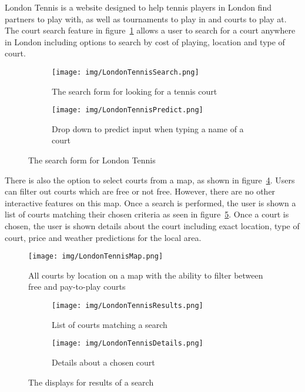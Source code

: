 London Tennis is a website designed to help tennis players in London find partners to play with, as well as tournaments to play in and courts to play at. The court search feature in figure~\ref{fig:LondonTennisSearch} allows a user to search for a court anywhere in London including options to search by cost of playing, location and type of court.

\begin{figure}[ht]
\centering
\begin{subfigure}[b]{0.6\textwidth}
                   \texttt{[image: img/LondonTennisSearch.png]}
                   \caption{The search form for looking for a tennis court}\label{fig:LondonTennisSearch}
\end{subfigure}%
\qquad
\begin{subfigure}[b]{0.3\textwidth}
\texttt{[image: img/LondonTennisPredict.png]}
\caption{Drop down to predict input when typing a name of a court}\label{fig:LondonTennisPredict}
            \end{subfigure}
            \qquad
\caption{The search form for London Tennis}\label{fig:LondonTennisSearchMain}
\end{figure}

There is also the option to select courts from a map, as shown in figure~\ref{fig:LondonTennisMap}. Users can filter out courts which are free or not free. However, there are no other interactive features on this map. Once a search is performed, the user is shown a list of courts matching their chosen criteria as seen in figure~\ref{fig:LondonTennisResults}. Once a court is chosen, the user is shown details about the court including exact location, type of court, price and weather predictions for the local area.

\begin{figure}
\begin{center}
\texttt{[image: img/LondonTennisMap.png]}
\end{center}
\caption{All courts by location on a map with the ability to filter between free and pay-to-play courts}\label{fig:LondonTennisMap}
\end{figure}

\begin{figure}[ht]
\centering
\begin{subfigure}[b]{0.7\textwidth}
                   \texttt{[image: img/LondonTennisResults.png]}
                   \caption{List of courts matching a search}\label{fig:LondonTennisResults}
\end{subfigure}
\begin{subfigure}[b]{0.7\textwidth}
                   \texttt{[image: img/LondonTennisDetails.png]}
                   \caption{Details about a chosen court}\label{fig:LondonTennisDetails}
\end{subfigure}
\caption{The displays for results of a search}\label{fig:LondonTennisResultsMain}
\end{figure}

